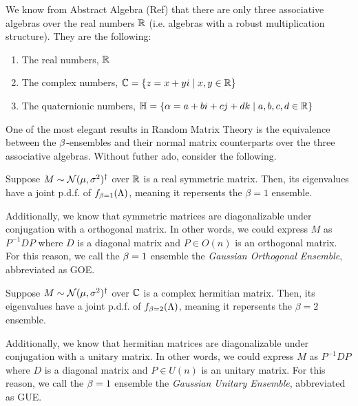 We know from Abstract Algebra (Ref) that there are only three associative algebras over the real numbers $\mathbb{R}$ (i.e. algebras with a robust multiplication structure).
They are the following:
\begin{enumerate}
  \item The real numbers, $\mathbb{R}$
  \item The complex numbers, $\mathbb{C} = \{ z = x + yi \mid x,y \in \mathbb{R} \}$
  \item The quaternionic numbers, $\mathbb{H} = \{ \alpha = a + bi + cj + dk \mid a,b,c,d \in \mathbb{R} \}$
\end{enumerate}


One of the most elegant results in Random Matrix Theory is the equivalence between the $\beta$-ensembles
and their normal matrix counterparts over the three associative algebras. Without futher ado, consider the following.

\medskip

 Suppose $M \sim \mathcal{N}(\mu,\sigma^2)^\dagger$ over $\mathbb{R}$ is a real symmetric matrix.
Then, its eigenvalues have a joint p.d.f. of $f_{\beta = 1}(\Lambda)$, meaning it repersents the $\beta = 1$ ensemble.

Additionally, we know that symmetric matrices are diagonalizable under conjugation with a orthogonal matrix.
In other words, we could express $M$ as $P^{-1} D P$ where $D$ is a diagonal matrix and $P \in O(n)$ is an orthogonal matrix.
For this reason, we call the $\beta = 1$ ensemble the \textit{Gaussian Orthogonal Ensemble}, abbreviated as GOE.

\bigskip

 Suppose $M \sim \mathcal{N}(\mu,\sigma^2)^\dagger$ over $\mathbb{C}$ is a complex hermitian matrix.
Then, its eigenvalues have a joint p.d.f. of $f_{\beta = 2}(\Lambda)$, meaning it repersents the $\beta = 2$ ensemble.

Additionally, we know that hermitian matrices are diagonalizable under conjugation with a unitary matrix.
In other words, we could express $M$ as $P^{-1} D P$ where $D$ is a diagonal matrix and $P \in U(n)$ is an unitary matrix.
For this reason, we call the $\beta = 1$ ensemble the \textit{Gaussian Unitary Ensemble}, abbreviated as GUE.

